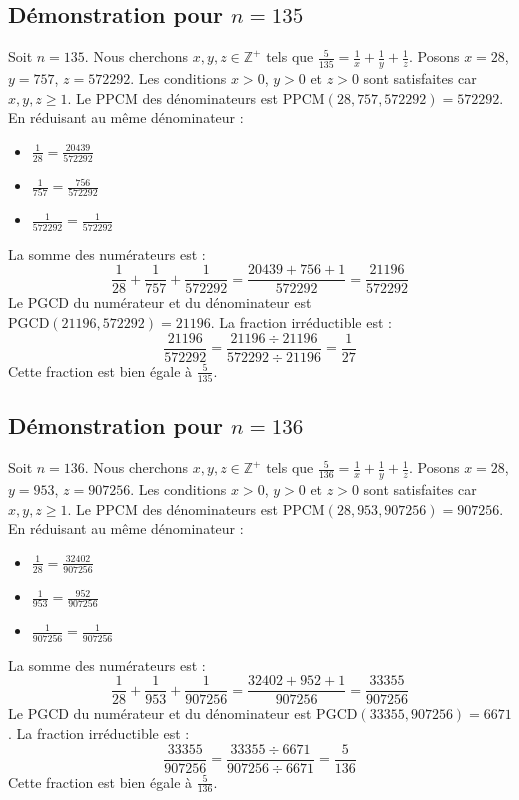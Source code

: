 \documentclass[11pt,a4paper]{article}
\begin{document}
\subsection{Démonstration pour $n = 135$}
Soit $n = 135$. Nous cherchons $x, y, z \in \mathbb{Z}^{+}$ tels que $\frac{5}{135} = \frac{1}{x} + \frac{1}{y} + \frac{1}{z}$.
Posons $x = 28$, $y = 757$, $z = 572292$.
Les conditions $x > 0$, $y > 0$ et $z > 0$ sont satisfaites car $x, y, z \geq 1$.
Le PPCM des dénominateurs est $\text{PPCM}(28, 757, 572292) = 572292$.
En réduisant au même dénominateur :
\begin{itemize}
    \item $\frac{1}{28} = \frac{20439}{572292}$
    \item $\frac{1}{757} = \frac{756}{572292}$
    \item $\frac{1}{572292} = \frac{1}{572292}$
\end{itemize}
La somme des numérateurs est :
$$ \frac{1}{28} + \frac{1}{757} + \frac{1}{572292} = \frac{20439 + 756 + 1}{572292} = \frac{21196}{572292} $$
Le PGCD du numérateur et du dénominateur est $\text{PGCD}(21196, 572292) = 21196$.
La fraction irréductible est :
$$ \frac{21196}{572292} = \frac{21196 \div 21196}{572292 \div 21196} = \frac{1}{27} $$
Cette fraction est bien égale à $\frac{5}{135}$.

\subsection{Démonstration pour $n = 136$}
Soit $n = 136$. Nous cherchons $x, y, z \in \mathbb{Z}^{+}$ tels que $\frac{5}{136} = \frac{1}{x} + \frac{1}{y} + \frac{1}{z}$.
Posons $x = 28$, $y = 953$, $z = 907256$.
Les conditions $x > 0$, $y > 0$ et $z > 0$ sont satisfaites car $x, y, z \geq 1$.
Le PPCM des dénominateurs est $\text{PPCM}(28, 953, 907256) = 907256$.
En réduisant au même dénominateur :
\begin{itemize}
    \item $\frac{1}{28} = \frac{32402}{907256}$
    \item $\frac{1}{953} = \frac{952}{907256}$
    \item $\frac{1}{907256} = \frac{1}{907256}$
\end{itemize}
La somme des numérateurs est :
$$ \frac{1}{28} + \frac{1}{953} + \frac{1}{907256} = \frac{32402 + 952 + 1}{907256} = \frac{33355}{907256} $$
Le PGCD du numérateur et du dénominateur est $\text{PGCD}(33355, 907256) = 6671$.
La fraction irréductible est :
$$ \frac{33355}{907256} = \frac{33355 \div 6671}{907256 \div 6671} = \frac{5}{136} $$
Cette fraction est bien égale à $\frac{5}{136}$.
\end{document}
